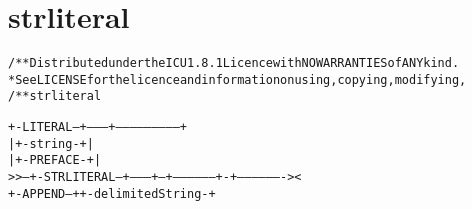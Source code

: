 \section{strliteral}
\begin{shaded}
\begin{alltt}
/**  Distributed under the ICU 1.8.1 Licence with NO WARRANTIES of ANY kind.
 *  See LICENSE for the licence and information on using, copying, modifying,
/** strliteral

       +-LITERAL--+--------+--------------------------+
       |          +-string-+                          |
       |             +-PREFACE-+                      |
   >>--+-STRLITERAL--+---------+--+-----------------+-+-------------------><
                     +-APPEND--+  +-delimitedString-+

\end{alltt}
\end{shaded}
